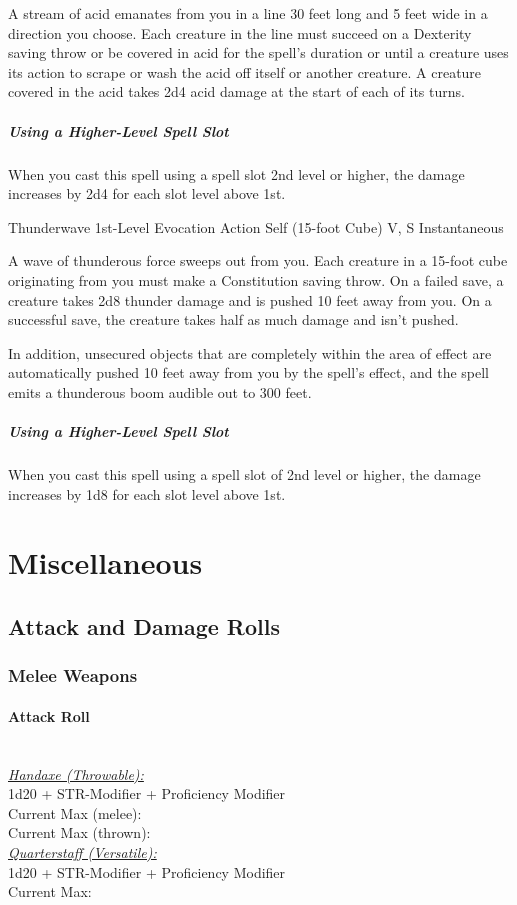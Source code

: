 \documentclass[letterpaper,openany,oneside,twocolumn]{book}
\begin{document}
A stream of acid emanates from you in a line 30 feet long and 5 feet wide in a direction you choose. Each creature in the line must succeed on a Dexterity saving throw or be covered in acid for the spell's duration or until a creature uses its action to scrape or wash the acid off itself or another creature. A creature covered in the acid takes 2d4 acid damage at the start of each of its turns.

\subparagraph*{Using a Higher-Level Spell Slot} When you cast this spell using a spell slot 2nd level or higher, the damage increases by 2d4 for each slot level above 1st.

\DndSpellHeader
  {Thunderwave}
  {1st-Level Evocation}
  {Action}
  {Self (15-foot Cube)}
  {V, S}
  {Instantaneous}

A wave of thunderous force sweeps out from you. Each creature in a 15-foot cube originating from you must make a Constitution saving throw. On a failed save, a creature takes 2d8 thunder damage and is pushed 10 feet away from you. On a successful save, the creature takes half as much damage and isn't pushed.

In addition, unsecured objects that are completely within the area of effect are automatically pushed 10 feet away from you by the spell's effect, and the spell emits a thunderous boom audible out to 300 feet.

\subparagraph*{Using a Higher-Level Spell Slot} When you cast this spell using a spell slot of 2nd level or higher, the damage increases by 1d8 for each slot level above 1st.

\vfill\eject
\section*{Miscellaneous}
\subsection*{Attack and Damage Rolls}
\subsubsection*{Melee Weapons}
\paragraph*{Attack Roll}\hfill\\
\underline{\textit{Handaxe (Throwable):}}\\
1d20 + STR-Modifier + Proficiency Modifier\\
\indent Current Max (melee): \\
\indent Current Max (thrown): 
\\
\underline{\textit{Quarterstaff (Versatile):}}\\
1d20 + STR-Modifier + Proficiency Modifier\\
\indent Current Max: 
\end{document}
